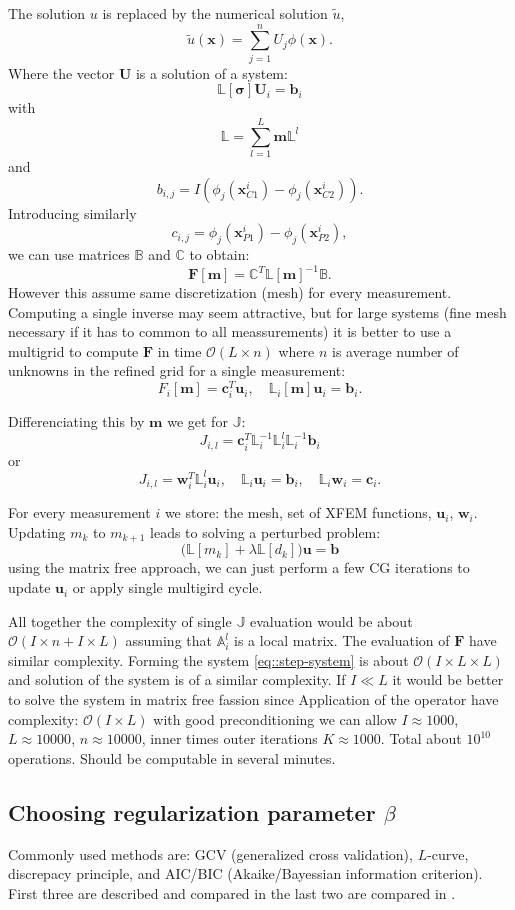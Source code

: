 \documentclass[a4paper, 12pt]{book}
\theoremstyle{definition}
\def\vc#1{\mathbf{\boldsymbol{#1}}}     %
\def\tn#1{{\mathbb{#1}}}    %
\begin{document}
The solution $u$ is replaced by the numerical solution $\tilde u$,
\[
    \tilde u(\vc x) = \sum_{j=1}^n U_j \phi(\vc x).
\]
Where the vector $\vc U$ is a solution of a system:
\[
    \tn L[\vc \sigma] \vc U_i = \vc b_i
\]
with
\[
    \tn L = \sum_{l=1}^L \vc m \tn L^l
\]
and
\[
    b_{i,j} = I(\phi_j(\vc x^i_{C1}) - \phi_j(\vc x^i_{C2})).
\]
Introducing similarly
\[
 c_{i,j} = \phi_j(\vc x^i_{P1}) - \phi_j(\vc x^i_{P2}),
\]
we can use matrices $\tn B$ and $\tn C$ to obtain:
\[
    \vc F[\vc m] = \tn C^T \tn L[\vc m]^{-1} \tn B.
\]
However this assume same discretization (mesh) for every measurement. Computing a single inverse
may seem attractive, but for large systems (fine mesh necessary if it has to common to all meassurements)
it is better to use a multigrid to compute $\vc F$ in time $\mathcal O(L\times n)$ where $n$ is average number of unknowns
in the refined grid for a single measurement:
\[
    F_i[\vc m] = \vc c_i^T \vc u_i, \quad \tn L_i[\vc m]\vc u_i =  \vc b_i.
\]

Differenciating this by $\vc m$ we get for $\tn J$:
\[
    J_{i,l} = \vc c_i^T \tn L_i^{-1} \tn L_i^l \tn L_i^{-1} \vc b_i
\]
or
\[
    J_{i,l} = \vc w_i^T \tn L_i^l \vc u_i, \quad \tn L_i \vc u_i = \vc b_i, \quad \tn L_i \vc w_i = \vc c_i.
\]

For every measurement $i$ we store: the mesh, set of XFEM functions, $\vc u_{i}$, $\vc w_{i}$. Updating $m_k$ to $m_{k+1}$
leads to solving a perturbed problem:
\[
   \Big(\tn L[m_k] + \lambda \tn L[d_k]\Big) \vc u = \vc b
\]
using the matrix free approach, we can just perform a few CG iterations to update $\vc u_i$ or apply single multigird cycle.

All together the complexity of single  $\tn J$ evaluation would be about
$\mathcal O(I \times n + I \times L)$ assuming that $\tn A_i^l$ is a local matrix. The evaluation of $\vc F$ have similar complexity.
Forming the system \eqref{eq::step-system} is about $\mathcal O(I \times L \times L)$ and solution of the system is of a similar complexity.
If $I \ll L$ it would be better to solve the system in matrix free fassion since Application of the operator have complexity:
$\mathcal O(I \times L)$ with good preconditioning we can allow $I \approx 1000$, $L\approx 10000$, $n\approx 10000$, inner times outer iterations $K\approx 1000$.
Total about $10^10$ operations. Should be computable in several minutes.

\subsection{Choosing regularization parameter $\beta$}
\label{sec:beta_choice}
Commonly used methods are: GCV (generalized cross validation), $L$-curve, discrepacy principle,
and AIC/BIC (Akaike/Bayessian information criterion). First three are described and compared in \cite{farquharson_2004}
the last two are compared in \cite{burnham_2004}.
\end{document}
